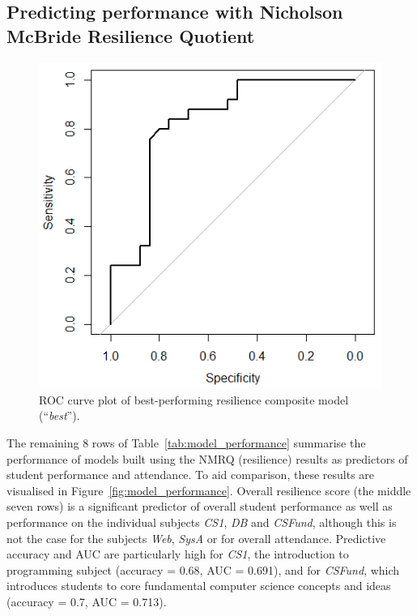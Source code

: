 \documentclass[sigconf]{acmart}
\begin{document}
\subsection{Predicting performance with Nicholson McBride Resilience Quotient}
\begin{figure} [h]
\centering
\includegraphics[width=.9\linewidth]{images/ROC_best_model.png}
\caption{ROC curve plot of best-performing resilience composite model (``{\em best}'').}
\label{fig:roc_curve} 
\end{figure}

The remaining 8 rows of Table~\ref{tab:model_performance} summarise the performance of models built using the NMRQ (resilience) results as predictors of student performance and attendance. To aid comparison, these results are visualised in Figure~\ref{fig:model_performance}. Overall resilience score (the middle seven rows) is a significant predictor of overall student performance as well as performance on the individual subjects {\em CS1}, {\em DB} and {\em CSFund}, although this is not the case for the subjects {\em Web}, {\em SysA} or for overall attendance. Predictive accuracy and AUC are particularly high for {\em CS1}, the introduction to programming subject (accuracy = 0.68, AUC = 0.691), and for {\em CSFund}, which introduces students to core fundamental computer science concepts and ideas (accuracy = 0.7, AUC = 0.713).
\end{document}
